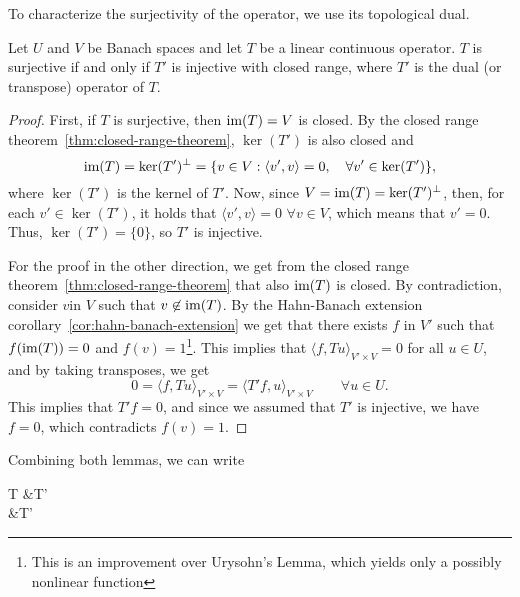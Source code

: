 To characterize the surjectivity of the operator, we use its topological dual.
\begin{lemma}
    Let $U$ and $V$ be Banach spaces and let $T$ be a linear continuous operator. $T$ is surjective if and only if $T'$ is injective with closed range, where $T'$ is the dual (or transpose) operator of $T$.
    \begin{proof}
        First, if $T$ is surjective, then $\operatorname{\text{im}} (T) = V$ is closed. By the closed range theorem~\ref{thm:closed-range-theorem}, $\ker(T')$ is also closed and 
        \begin{equation}
            \operatorname{\text{im}} (T) = \ker (T')^\bot = 
            \{v\in V: \langle v', v\rangle = 0,\quad \forall v' \in \ker(T')\},
        \end{equation}
        where $\ker(T')$ is the kernel of $T'$. Now, since $V = \operatorname{\text{im}}(T) = \ker(T')^\bot$, then, for each $v' \in \ker(T')$, it holds that $ \langle v', v\rangle = 0$ $\forall v \in V$, which means that $v' = 0$. Thus, $\ker(T') = \{0\}$, so $T'$ is injective.

        For the proof in the other direction, we get from the closed range theorem~\ref{thm:closed-range-theorem} that also $\operatorname{\text{im}}(T)$ is closed. By contradiction, consider $v$in $V$ such that $v\not\in \operatorname{\text{im}}(T)$. By the Hahn-Banach extension corollary~\ref{cor:hahn-banach-extension} we get that there exists $f$ in $V'$ such that $f(\operatorname{\text{im}}(T)) = 0$ and $f(v)=1$\footnote{This is an improvement over Urysohn's Lemma, which yields only a possibly nonlinear function}. This implies that $\langle f, Tu\rangle_{V'\times V} = 0$ for all $u\in U$, and by taking transposes, we get 
        \begin{equation*}
            0 = \langle f, Tu\rangle_{V'\times V} = \langle T'f, u\rangle_{V'\times V} \qquad \forall u\in U.
        \end{equation*}
        This implies that $T'f=0$, and since we assumed that $T'$ is injective, we have $f=0$, which contradicts $f(v)=1$. 
    \end{proof}
\end{lemma}
Combining both lemmas, we can write
\begin{tightalign*}
    T 
    &\Longleftrightarrow T'
    \\&\Longleftrightarrow T'
\end{tightalign*}

